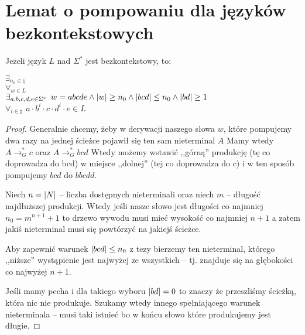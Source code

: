 \section{Lemat o pompowaniu dla języków bezkontekstowych}

\begin{theorem}
    Jeżeli język \(L\) nad \(\Sigma^*\) jest bezkontekstowy, to: 
    
    \( \exists_{n_0 \in \natural} \) \\
    \( \forall_{w \in L} \) \\
    \( \exists_{a, b, c, d, e \in \Sigma^*} \hspace{5pt} w = abcde \land \card{w} \geq n_0 \land |bcd| \leq n_0 \land |bd| \geq 1 \) \\
    \( \forall_{i \in \natural} \hspace{5pt} a \cdot b^{i} \cdot c \cdot d^{i} \cdot e \in L\)
\end{theorem}
\begin{proof}
    Generalnie chcemy, żeby w derywacji naszego słowa \( w \), które pompujemy dwa razy na jednej ścieżce pojawił się ten sam nieterminal \( A \) Mamy wtedy \( A \rightarrow_G^* c\) oraz \( A \rightarrow_G^* bcd \) Wtedy możemy wstawić ,,górną'' produkcję (tę co doprowadza do bcd) w miejsce ,,dolnej'' (tej co doprowadza do c) i w ten sposób pompujemy \( bcd \) do  \( bbcdd \).
    
    
    Niech \( n = \card{N} \) -- liczba dostępnych nieterminali oraz niech \( m \) -- długość najdłuższej produkcji.
    Wtedy jeśli nasze słowo jest długości co najmniej \( n_0 = m^{n + 1} + 1 \) to drzewo wywodu musi mieć wysokość co najmniej \( n + 1 \) a zatem jakiś nieterminal musi się powtórzyć na jakiejś ścieżce.
    
    Aby zapewnić warunek \( \card{bcd} \leq n_0 \) z tezy bierzemy ten nieterminal, którego ,,niższe'' wystąpienie jest najwyżej ze wszystkich -- tj. znajduje się na głębokości co najwyżej \( n + 1 \).
    
    Jeśli mamy pecha i dla takiego wyboru \( \card{bd} = 0 \) to znaczy że przeszliśmy ścieżką, która nic nie produkuje. 
    Szukamy wtedy innego spełniającego warunek nieterminala -- musi taki istnieć bo w końcu słowo które produkujemy jest długie.
    
\end{proof}
